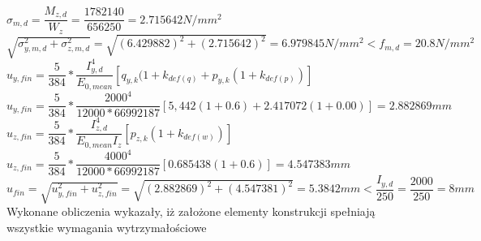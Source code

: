 \documentclass[12pt,a4paper]{article}
\begin{document}
$\sigma_{m,d}=\dfrac{M_{z,d}}{W_z}=\dfrac{1782140}{656250}=2.715642N/mm^2$\\
$\sqrt{\sigma_{y,m,d}^2+\sigma_{z,m,d}^2}=\sqrt{(6.429882)^2+(2.715642)^2}=6.979845N/mm^2<f_{m,d}=20.8N/mm^2$\\
$u_{y,fin}=\dfrac{5}{384}*\dfrac{I_{y,d}^4}{E_{0,mean}}[q_{y,k}(1+k_{def(q)}+p_{y,k}(1+k_{def(p)})]$\\
$u_{y,fin}=\dfrac{5}{384}*\dfrac{2000^4}{12000*66992187}[5,442(1+0.6)+2.417072(1+0.00)]=2.882869mm$\\
$u_{z,fin}=\dfrac{5}{384}*\dfrac{I_{z,d}^4}{E_{0,mean}I_z}[p_{z,k}(1+k_{def(w)})]$\\
$u_{z,fin}=\dfrac{5}{384}*\dfrac{4000^4}{12000*66992187}[0.685438(1+0.6)]= 4.547383mm$\\
$u_{fin}=\sqrt{u_{y,fin}^2+u_{z,fin}^2}=\sqrt{(2.882869)^2+(4.547381)^2}=5.3842mm<\dfrac{I_{y,d}}{250}=\dfrac{2000}{250}=8mm$\\
Wykonane obliczenia wykazały, iż założone elementy konstrukcji spełniają wszystkie wymagania wytrzymałościowe
\end{document}
